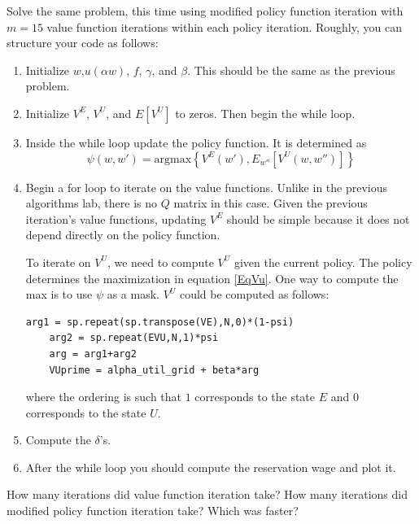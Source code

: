 \begin{problem}
Solve the same problem, this time using modified policy function iteration with $m=15$ value function iterations within each policy iteration.  Roughly, you can structure your code as follows:

\begin{enumerate}
	\item Initialize $w$,$u(\alpha w)$, $f$, $\gamma$, and $\beta$.  This should be the same as the previous problem.
	
	\item	Initialize $V^E$, $V^U$, and $E[V^U]$ to zeros.  Then begin the while loop.
	
	\item Inside the while loop update the policy function.  It is determined as
	\begin{equation}
		\psi (w,w') = \text{argmax} \left\{ V^E(w'), E_{w''}[V^U(w,w'')]\right\}
	\end{equation}
	
	\item Begin a for loop to iterate on the value functions.  Unlike in the previous algorithms lab, there is no $Q$ matrix in this case.  Given the previous iteration's value functions, updating $V^E$ should be simple because it does not depend directly on the policy function.
	
	To iterate on $V^U$, we need to compute $V^U$ given the current policy.  The policy determines the maximization in equation \eqref{EqVu}.  One way to compute the max is to use $\psi$ as a mask.  $V^U$ could be computed as follows:
	
	\begin{lstlisting}[style = python]
	arg1 = sp.repeat(sp.transpose(VE),N,0)*(1-psi)
    arg2 = sp.repeat(EVU,N,1)*psi
    arg = arg1+arg2
    VUprime = alpha_util_grid + beta*arg
	\end{lstlisting}	
\newpage
	where the ordering is such that $1$ corresponds to the state $E$ and $0$ corresponds to the state $U$.
	
	\item Compute the $\delta$'s.
	
	\item After the while loop you should compute the reservation wage and plot it.
\end{enumerate}
\end{problem}

\begin{problem}
How many iterations did value function iteration take?
How many iterations did modified policy function iteration take?
Which was faster?
\end{problem} 